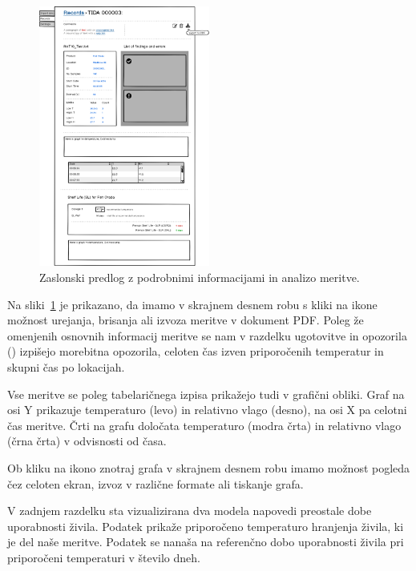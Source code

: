 \documentclass[a4paper, 12pt]{book}
\begin{document}
\begin{figure}[h]
\begin{center}
\includegraphics[width=0.5\textwidth]{slike/Record-view.png}
\end{center}
\caption{Zaslonski predlog z podrobnimi informacijami in analizo meritve.}
\label{record-wireframe}
\end{figure}

Na sliki~\ref{record-wireframe} je prikazano, da imamo v skrajnem desnem robu s kliki na ikone možnost urejanja, brisanja ali izvoza meritve v dokument PDF.
Poleg že omenjenih osnovnih informacij meritve se nam v razdelku ugotovitve in opozorila () izpišejo morebitna opozorila, celoten čas izven priporočenih temperatur in skupni čas po lokacijah.

Vse meritve se poleg tabelaričnega izpisa prikažejo tudi v grafični obliki.
Graf na osi Y prikazuje temperaturo (levo) in relativno vlago (desno), na osi X pa celotni čas meritve. Črti na grafu določata temperaturo (modra črta) in relativno vlago (črna črta) v odvisnosti od časa.

Ob kliku na ikono znotraj grafa v skrajnem desnem robu imamo možnost pogleda čez celoten ekran, izvoz v različne formate ali tiskanje grafa.

V zadnjem razdelku sta vizualizirana dva modela napovedi preostale dobe uporabnosti živila. Podatek  prikaže priporočeno temperaturo hranjenja živila, ki je del naše meritve. Podatek  se nanaša na referenčno dobo uporabnosti živila pri priporočeni temperaturi v število dneh. 
\end{document}
